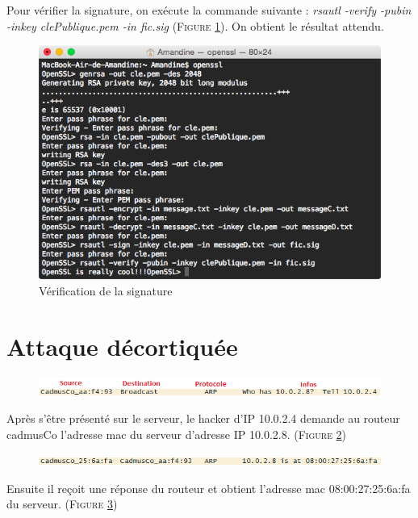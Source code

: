 \documentclass[11pt]{article}
\begin{document}
Pour vérifier la signature, on exécute la commande suivante : \textit{rsautl -verify -pubin -inkey clePublique.pem -in fic.sig} (\textsc{Figure \ref{fig:verification}}). On obtient le résultat attendu. 
    \begin{figure}[h!]
        \centering \includegraphics[scale=0.4]{Capture/question6c.png}
        \caption{Vérification de la signature}
         \label{fig:verification}
\end{figure}
\newpage
\section{Attaque décortiquée}

  \begin{figure}[h!]
        \centering \includegraphics[scale=1]{Exo3/1.png}
        \caption{}
         \label{fig:1}
\end{figure}
Après s’être présenté sur le serveur, le hacker d’IP 10.0.2.4 demande au routeur cadmusCo l’adresse mac du serveur d’adresse IP 10.0.2.8. (\textsc{Figure \ref{fig:1}})

\vspace{1cm}
 \begin{figure}[h!]
        \centering \includegraphics[scale=1]{Exo3/2.png}
        \caption{}
         \label{fig:2}
\end{figure}
Ensuite il reçoit une réponse du routeur et obtient l’adresse mac  08:00:27:25:6a:fa du serveur.  (\textsc{Figure \ref{fig:2}})
\end{document}

